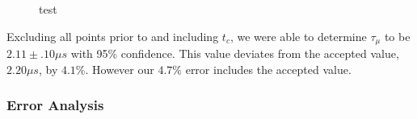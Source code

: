 \begin{figure}[htbp]
\begin{center}
\hspace{-7mm}
\vspace{-2mm}
\vspace{-2mm}
\vspace{-2mm}
\caption{test}
\label{autocorr}
\end{center}
\end{figure}

Excluding all points prior to and including $t_{c}$, we were able to determine $\tau_{\mu}$ to be $2.11 \pm .10 \mu s$ with 95\% confidence.  This value deviates from the accepted value, $2.20\mu s$, by $4.1\%$.  However our $4.7\%$ error includes the accepted value.


\subsubsection{Error Analysis}


